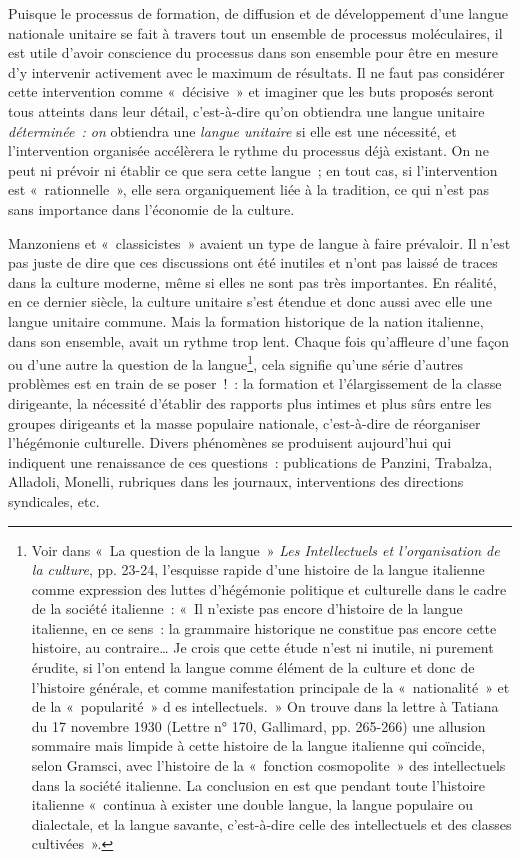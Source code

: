 \documentclass[french,twoside]{book} %
\begin{document}
\noindent Puisque le processus de formation, de diffusion et de développement d’une langue nationale unitaire se fait à travers tout un ensemble de processus moléculaires, il est utile d’avoir conscience du processus dans son ensemble pour être en mesure d’y intervenir activement avec le maximum de résultats. Il ne faut pas considérer cette intervention comme « décisive » et imaginer que les buts proposés seront tous atteints dans leur détail, c’est-à-dire qu’on obtiendra une langue unitaire \emph{déterminée : on} obtiendra une \emph{langue unitaire} si elle est une nécessité, et l’intervention organisée accélèrera le rythme du processus déjà existant. On ne peut ni prévoir ni établir ce que sera cette langue ; en tout cas, si l’intervention est « rationnelle », elle sera organiquement liée à la tradition, ce qui n’est pas sans importance dans l’économie de la culture.\par
Manzoniens et « classicistes » avaient un type de langue à faire prévaloir. Il n’est pas juste de dire que ces discussions ont été inutiles et n’ont pas laissé de traces dans la culture moderne, même si elles ne sont pas très importantes. En réalité, en ce dernier siècle, la culture unitaire s’est étendue et donc aussi avec elle une langue unitaire commune. Mais la formation historique de la nation italienne, dans son ensemble, avait un rythme trop lent. Chaque fois qu’affleure d’une façon ou d’une autre la question de la langue\footnote{Voir dans « La question de la langue » \emph{Les Intellectuels et l’organisation de la culture}, pp. 23-24, l’esquisse rapide d’une histoire de la langue italienne comme expression des luttes d’hégémonie politique et culturelle dans le cadre de la société italienne : « Il n’existe pas encore d’histoire de la langue italienne, en ce sens : la grammaire historique ne constitue pas encore cette histoire, au contraire… Je crois que cette étude n’est ni inutile, ni purement érudite, si l’on entend la langue comme élément de la culture et donc de l’histoire générale, et comme manifestation principale de la « nationalité » et de la « popularité » d es intellectuels. » On trouve dans la lettre à Tatiana du 17 novembre 1930 (Lettre n° 170, Gallimard, pp. 265-266) une allusion sommaire mais limpide à cette histoire de la langue italienne qui coïncide, selon Gramsci, avec l’histoire de la « fonction cosmopolite » des intellectuels dans la société italienne. La conclusion en est que pendant toute l’histoire italienne « continua à exister une double langue, la langue populaire ou dialectale, et la langue savante, c’est-à-dire celle des intellectuels et des classes cultivées ». }, cela signifie qu’une série d’autres problèmes est en train de se poser ! : la formation et l’élargissement de la classe dirigeante, la nécessité d’établir des rapports plus intimes et plus sûrs entre les groupes dirigeants et la masse populaire nationale, c’est-à-dire de réorganiser l’hégémonie culturelle. Divers phénomènes se produisent aujourd’hui qui indiquent une renaissance de ces questions : publications de Panzini, Trabalza, Alladoli, Monelli, rubriques dans les journaux, interventions des directions syndicales, etc.
\end{document}
